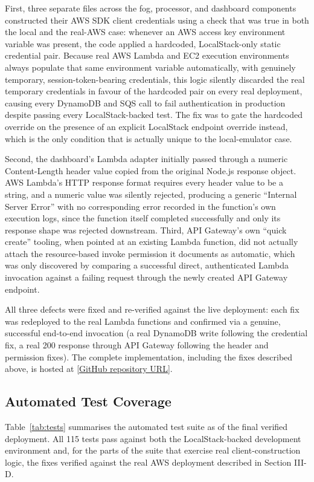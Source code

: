 \documentclass[conference]{IEEEtran}
\begin{document}
First, three separate files across the fog, processor, and dashboard components constructed their AWS SDK client credentials using a check that was true in both the local and the real-AWS case: whenever an AWS access key environment variable was present, the code applied a hardcoded, LocalStack-only static credential pair. Because real AWS Lambda and EC2 execution environments always populate that same environment variable automatically, with genuinely temporary, session-token-bearing credentials, this logic silently discarded the real temporary credentials in favour of the hardcoded pair on every real deployment, causing every DynamoDB and SQS call to fail authentication in production despite passing every LocalStack-backed test. The fix was to gate the hardcoded override on the presence of an explicit LocalStack endpoint override instead, which is the only condition that is actually unique to the local-emulator case.

Second, the dashboard's Lambda adapter initially passed through a numeric Content-Length header value copied from the original Node.js response object. AWS Lambda's HTTP response format requires every header value to be a string, and a numeric value was silently rejected, producing a generic ``Internal Server Error'' with no corresponding error recorded in the function's own execution logs, since the function itself completed successfully and only its response shape was rejected downstream. Third, API Gateway's own ``quick create'' tooling, when pointed at an existing Lambda function, did not actually attach the resource-based invoke permission it documents as automatic, which was only discovered by comparing a successful direct, authenticated Lambda invocation against a failing request through the newly created API Gateway endpoint.

All three defects were fixed and re-verified against the live deployment: each fix was redeployed to the real Lambda functions and confirmed via a genuine, successful end-to-end invocation (a real DynamoDB write following the credential fix, a real 200 response through API Gateway following the header and permission fixes). The complete implementation, including the fixes described above, is hosted at \href{[GitHub repository URL]}{[GitHub repository URL]}.

\subsection{Automated Test Coverage}
Table~\ref{tab:tests} summarises the automated test suite as of the final verified deployment. All 115 tests pass against both the LocalStack-backed development environment and, for the parts of the suite that exercise real client-construction logic, the fixes verified against the real AWS deployment described in Section III-D.
\end{document}
